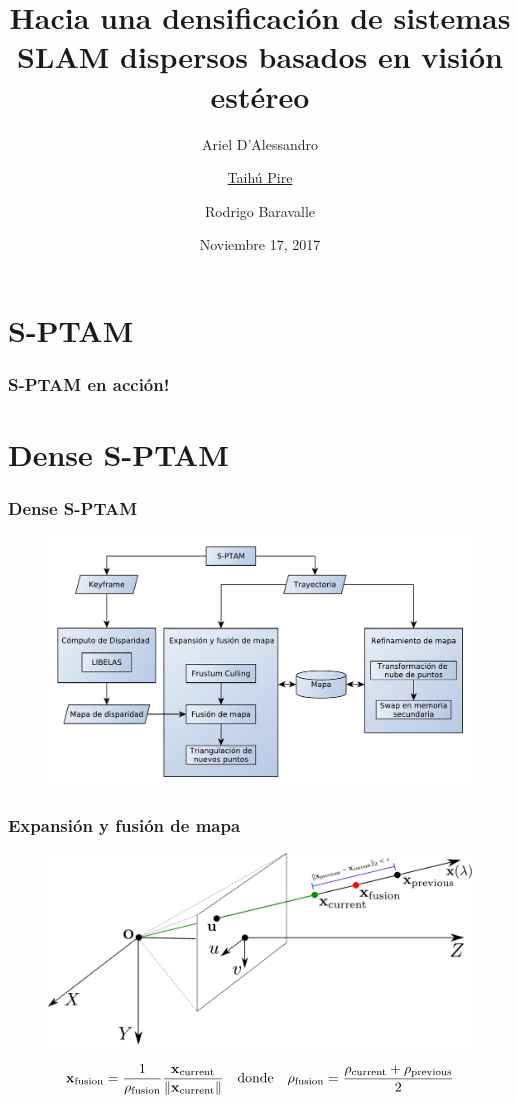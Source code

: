 \documentclass[compress]{beamer}
\title{Hacia una densificación de sistemas SLAM	dispersos basados en visión estéreo}
\author{Ariel D'Alessandro \and \underline{Taihú Pire} \and Rodrigo Baravalle}
\institute{	CIFASIS - CONICET - UNR}
\date{\scriptsize{Noviembre 17, 2017}}
\begin{document}
\frame{\titlepage}

\section{S-PTAM}

\begin{frame}
	\frametitle{S-PTAM en acción!}
	\centering
	
\end{frame}


\section{Dense S-PTAM}

\begin{frame}
	\frametitle{Dense S-PTAM}
	\begin{figure}[htb]
		\centering
		\includegraphics[width=0.8\columnwidth]{images/dense_diagram.pdf}
	\end{figure}
\end{frame}

\begin{frame}
	\frametitle{Expansión y fusión de mapa}
	\begin{figure}[htb]
		\centering
		\includegraphics[width=\columnwidth]{images/map_fusion.pdf}
	\end{figure}
	
	\begin{equation*}
		\boldsymbol{\mathbf{x}}_{\mathrm{\mathrm{fusion}}} = \dfrac{1}{\rho_\mathrm{\mathrm{fusion}}} \dfrac{\boldsymbol{\mathbf{x}}_{\mathrm{\mathrm{current}}}}{\lVert\boldsymbol{\mathbf{x}}_{\mathrm{\mathrm{current}}}\rVert}
		\quad \text{donde} \quad 
		\rho_{\mathrm{fusion}} = \dfrac{\rho_{\mathrm{current}} + \rho_{\mathrm{previous}}}{2}
	\end{equation*}
\end{frame}
\end{document}

